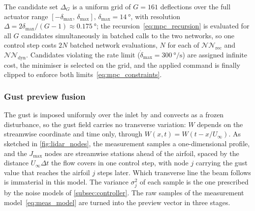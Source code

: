 The candidate set $\Delta_G$ is a uniform grid of $G = 161$ deflections over the full actuator range $[-\delta_{\max},\,\delta_{\max}]$, $\delta_{\max} = \SI{14}{\degree}$, with resolution $\Delta = 2\delta_{\max}/(G-1) \approx \SI{0.175}{\degree}$; the recursion~\eqref{eq:mpc_recursion} is evaluated for all $G$ candidates simultaneously in batched calls to the two networks, so one control step costs $2N$ batched network evaluations, $N$ for each of $\mathcal{NN}_{\text{rec}}$ and $\mathcal{NN}_{\text{dyn}}$. Candidates violating the rate limit ($\dot\delta_{\max} = \SI{300}{\degree\per\second}$) are assigned infinite cost, the minimiser is selected on the grid, and the applied command is finally clipped to enforce both limits~\eqref{eq:mpc_constraints}.

\subsubsection{Gust preview fusion}
\label{subsubsec:fusion}

The gust is imposed uniformly over the inlet by  and convects as a frozen disturbance, so the gust field carries no transverse variation: $W$ depends on the streamwise coordinate and time only, through $W(x,t) = W(t - x/U_\infty)$. As sketched in \cref{fig:lidar_nodes}, the measurement samples a one-dimensional profile, and the $J_{\max}$ nodes are streamwise stations ahead of the airfoil, spaced by the distance $U_\infty\Delta t$ the flow covers in one control step, with node $j$ carrying the gust value that reaches the airfoil $j$ steps later. Which transverse line the beam follows is immaterial in this model.  The variance $\sigma_j^2$ of each sample is the one prescribed by the noise models of \cref{subsec:controller}. The raw samples of the measurement model~\eqref{eq:meas_model} are turned into the preview vector in three stages.


